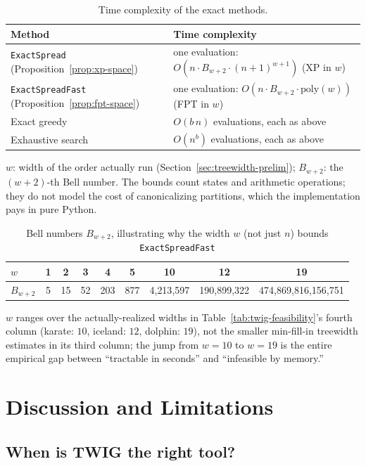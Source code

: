 \documentclass[preprint,11pt]{elsarticle}
\theoremstyle{definition}
\theoremstyle{remark}
\newcommand{\up}{\rule{0pt}{2.6ex}}
\newcommand{\down}{\rule[-1.2ex]{0pt}{0pt}}
\begin{document}
\begin{table}[h]
\centering
\caption{Time complexity of the exact methods.}\label{tab:complexity}
\small
\begin{tabular}{@{}ll@{}}
\hline
\up Method & Time complexity \\
\hline
\up \texttt{ExactSpread} (Proposition~\ref{prop:xp-space}) & one evaluation: $O(n\cdot B_{w+2}\cdot(n+1)^{w+1})$ (XP in $w$) \\
\texttt{ExactSpreadFast} (Proposition~\ref{prop:fpt-space}) & one evaluation: $O(n\cdot B_{w+2}\cdot\mathrm{poly}(w))$ (FPT in $w$) \\
Exact greedy & $O(b\,n)$ evaluations, each as above \\
\down Exhaustive search & $O(n^b)$ evaluations, each as above \\
\hline
\end{tabular}

\smallskip
{\footnotesize $w$: width of the order actually run (Section~\ref{sec:treewidth-prelim}); $B_{w+2}$: the $(w+2)$-th Bell number. The bounds count states and arithmetic operations; they do not model the cost of canonicalizing partitions, which the implementation pays in pure Python.}
\end{table}

\begin{table}[h]
\centering
\caption{Bell numbers $B_{w+2}$, illustrating why the width $w$ (not just $n$) bounds \texttt{ExactSpreadFast}\label{tab:bell-numbers}}
\begin{tabular}{@{}lcccccccc@{}}
\hline
\up $w$ & 1 & 2 & 3 & 4 & 5 & 10 & 12 & 19 \\
\hline
\down $B_{w+2}$ & 5 & 15 & 52 & 203 & 877 & 4{,}213{,}597 & 190{,}899{,}322 & 474{,}869{,}816{,}156{,}751 \\
\hline
\end{tabular}
{\footnotesize $w$ ranges over the actually-realized widths in
Table~\ref{tab:twig-feasibility}'s fourth column (karate: $10$, iceland:
$12$, dolphin: $19$), not the smaller min-fill-in treewidth estimates in
its third column; the jump from $w=10$ to $w=19$ is the entire empirical
gap between ``tractable in seconds'' and ``infeasible by memory.''}
\end{table}
\section{Discussion and Limitations}\label{sec:discussion}

\subsection{When is TWIG the right tool?}\label{sec:discussion-twig}
\end{document}
